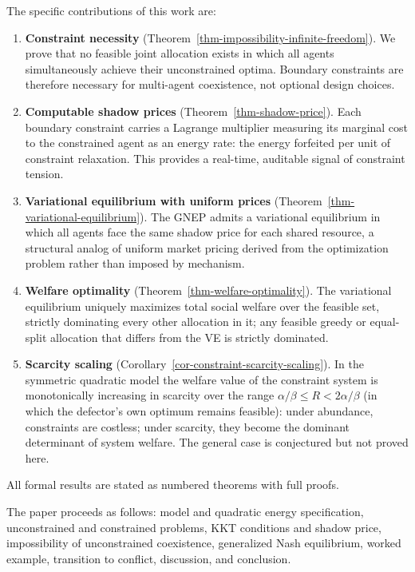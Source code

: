 \documentclass[11pt]{article}
\theoremstyle{plain}
\theoremstyle{definition}
\theoremstyle{remark}
\begin{document}
The specific contributions of this work are:

\begin{enumerate}
\def\labelenumi{\arabic{enumi}.}
\item
  \textbf{Constraint necessity}
  (Theorem~\ref{thm-impossibility-infinite-freedom}). We prove that no
  feasible joint allocation exists in which all agents simultaneously
  achieve their unconstrained optima. Boundary constraints are therefore
  necessary for multi-agent coexistence, not optional design choices.
\item
  \textbf{Computable shadow prices} (Theorem~\ref{thm-shadow-price}).
  Each boundary constraint carries a Lagrange multiplier measuring its
  marginal cost to the constrained agent as an energy rate: the energy
  forfeited per unit of constraint relaxation. This provides a
  real-time, auditable signal of constraint tension.
\item
  \textbf{Variational equilibrium with uniform prices}
  (Theorem~\ref{thm-variational-equilibrium}). The GNEP admits a
  variational equilibrium in which all agents face the same shadow price
  for each shared resource, a structural analog of uniform market
  pricing derived from the optimization problem rather than imposed by
  mechanism.
\item
  \textbf{Welfare optimality} (Theorem~\ref{thm-welfare-optimality}).
  The variational equilibrium uniquely maximizes total social welfare
  over the feasible set, strictly dominating every other allocation in
  it; any feasible greedy or equal-split allocation that differs from
  the VE is strictly dominated.
\item
  \textbf{Scarcity scaling}
  (Corollary~\ref{cor-constraint-scarcity-scaling}). In the symmetric
  quadratic model the welfare value of the constraint system is
  monotonically increasing in scarcity over the range
  \(\alpha/\beta \leq R < 2\alpha/\beta\) (in which the defector's own
  optimum remains feasible): under abundance, constraints are costless;
  under scarcity, they become the dominant determinant of system
  welfare. The general case is conjectured but not proved here.
\end{enumerate}

All formal results are stated as numbered theorems with full proofs.

The paper proceeds as follows: model and quadratic energy specification,
unconstrained and constrained problems, KKT conditions and shadow price,
impossibility of unconstrained coexistence, generalized Nash
equilibrium, worked example, transition to conflict, discussion, and
conclusion.
\end{document}

